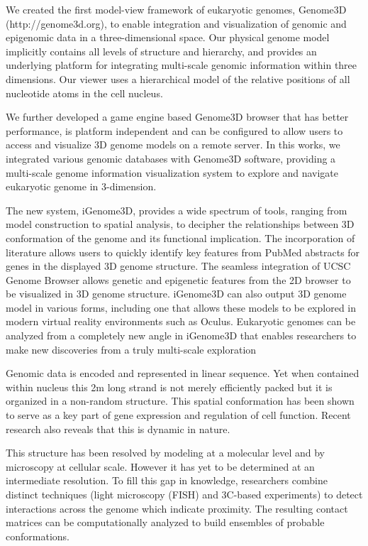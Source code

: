 \documentclass[a4paper]{article}
\begin{document}
We created the first model-view framework of eukaryotic
genomes, Genome3D (http://genome3d.org), to enable integration and
visualization of genomic and epigenomic data in a three-dimensional space.
Our physical genome model implicitly contains all levels of structure and
hierarchy, and provides an underlying platform for integrating multi-scale
genomic information within three dimensions. Our viewer uses a
hierarchical model of the relative positions of all nucleotide atoms in
the cell nucleus. 

We further developed a game engine based Genome3D
browser that has better performance, is platform independent and can be
configured to allow users to access and visualize 3D genome models on a
remote server. In this works, we integrated various genomic databases with
Genome3D software, providing a multi-scale genome information
visualization system to explore and navigate eukaryotic genome in
3-dimension.  

The new system, iGenome3D, provides a wide spectrum of
tools, ranging from model construction to spatial analysis, to decipher
the relationships between 3D conformation of the genome and its functional
implication.  The incorporation of literature allows users to quickly
identify key features from PubMed abstracts for genes in the displayed 3D
genome structure.  The seamless integration of UCSC Genome Browser allows
genetic and epigenetic features from the 2D browser to be visualized in 3D
genome structure. iGenome3D can also output 3D genome model in various
forms, including one that allows these models to be explored in modern
virtual reality environments such as Oculus.  Eukaryotic genomes can be
analyzed from a completely new angle in iGenome3D that enables researchers
to make new discoveries from a truly multi-scale exploration




Genomic data is encoded and represented in linear sequence. Yet when contained within nucleus this 2m long strand is not merely efficiently packed but it is organized in a non-random structure. This spatial conformation has been shown to serve as a key part of gene expression and regulation of cell function. Recent research also reveals that this is dynamic in nature.

This structure has been resolved by modeling at a molecular level and by microscopy at cellular scale. However it has yet to be determined at an intermediate resolution. To fill this gap in knowledge, researchers combine distinct techniques (light microscopy (FISH) and 3C-based experiments) to detect interactions across the genome which indicate proximity. The resulting contact matrices can be computationally analyzed to build ensembles of probable conformations.
\end{document}

